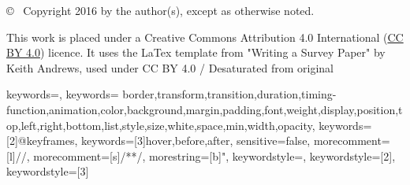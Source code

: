 \documentclass[11pt,onecolumn,twoside]{report}
\begin{document}
\begin{titlepage}
\begin{quote}
\end{quote}

\vfill

\begin{center}
{\small\sffamily \copyright ~ Copyright 2016 by the author(s),
except as otherwise noted.}

\vspace{2mm}
{\footnotesize\sffamily This work is placed under a
Creative Commons Attribution 4.0 International
(\href{https://creativecommons.org/licenses/by/4.0/}{CC BY 4.0}) licence. It uses the LaTex template from "Writing a Survey Paper" by Keith Andrews, used under CC BY 4.0 / Desaturated from original
}
\end{center}

\end{titlepage}




\cleardoublepage
\pagestyle{plain}



{
\setlength{\parskip}{3pt plus 3pt minus 3pt}     %
\tableofcontents
{}

\cleardoublepage
\listoffigures
{}


\cleardoublepage
\renewcommand{\lstlistlistingname}{List of Listings}
\lstlistoflistings
{}
}

{ 
keywords={},
keywords={ border,transform,transition,duration,timing-function,animation,color,background,margin,padding,font,weight,display,position,top,left,right,bottom,list,style,size,white,space,min,width,opacity},
keywords=[2]{@keyframes},
keywords=[3]{hover,before,after},
sensitive=false, 
morecomment=[l]{//}, 
morecomment=[s]{/*}{*/}, 
morestring=[b]",
keywordstyle=\color{blue},
keywordstyle=[2]\color{violet},
keywordstyle=[3]\color{orange}
}

\cleardoublepage
\pagestyle{headings}        %

\cleardoublepage


\cleardoublepage


\cleardoublepage




\cleardoublepage


\cleardoublepage


\cleardoublepage
\printbibliography[heading=bibintoc]
\end{document}
